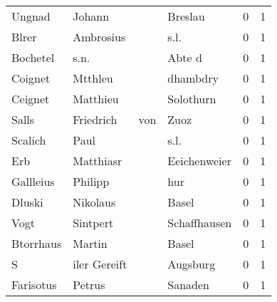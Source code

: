 \begin{tabular}{llllrr}
                   Ungnad &                             Johann &             &                                     Breslau &          0 &         1 \\
                    Blrer &                          Ambrosius &             &                                        s.l. &          0 &         1 \\
                 Bochetel &                               s.n. &             &                                      Abte d &          0 &         1 \\
                  Coignet &                            Mtthleu &             &                                    dhambdry &          0 &         1 \\
                  Ceignet &                           Matthieu &             &                                   Solothurn &          0 &         1 \\
                    Salls &                          Friedrich &         von &                                        Zuoz &          0 &         1 \\
                  Scalich &                               Paul &             &                                        s.l. &          0 &         1 \\
                      Erb &                          Matthiasr &             &                                Eeichenweier &          0 &         1 \\
                Gallleius &                            Philipp &             &                                         hur &          0 &         1 \\
                   Dluski &                           Nikolaus &             &                                       Basel &          0 &         1 \\
                     Vogt &                           Sintpert &             &                                Schaffhausen &          0 &         1 \\
                Btorrhaus &                             Martin &             &                                       Basel &          0 &         1 \\
                        S &                       iler Gereift &             &                                    Augsburg &          0 &         1 \\
                Farisotus &                             Petrus &             &                                     Sanaden &          0 &         1 \\

\end{tabular}
